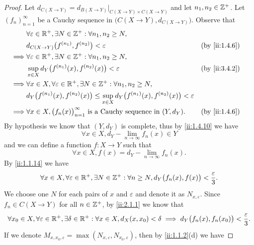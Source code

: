 \begin{proof}
  Let \(d_{C(X \to Y)} = d_{B(X \to Y)}|_{C(X \to Y) \times C(X \to Y)}\) and let \(n_1, n_2 \in \mathbb{Z}^+\).
  Let \((f_n)_{n = 1}^\infty\) be a Cauchy sequence in \(\big(C(X \to Y), d_{C(X \to Y)}\big)\).
  Observe that
  \begin{align*}
             & \forall \varepsilon \in \R^+, \exists N \in \Z^+ : \forall n_1, n_2 \geq N,                                                          \\
             & d_{C(X \to Y)}\big(f^{(n_1)}, f^{(n_2)}\big) < \varepsilon                                                        &  & \by{ii:1.4.6} \\
    \implies & \forall \varepsilon \in \R^+, \exists N \in \Z^+ : \forall n_1, n_2 \geq N,                                                          \\
             & \sup_{x \in X} d_Y\big(f^{(n_1)}(x), f^{(n_2)}(x)\big) < \varepsilon                                              &  & \by{ii:3.4.2} \\
    \implies & \forall x \in X, \forall \varepsilon \in \R^+, \exists N \in \Z^+ : \forall n_1, n_2 \geq N,                                         \\
             & d_Y\big(f^{(n_1)}(x), f^{(n_2)}(x)\big) \leq \sup_{x \in X} d_Y\big(f^{(n_1)}(x), f^{(n_2)}(x)\big) < \varepsilon                    \\
    \implies & \forall x \in X, \big(f_n(x)\big)_{n = 1}^\infty \text{ is a Cauchy sequence in } (Y, d_Y).                       &  & \by{ii:1.4.6}
  \end{align*}
  By hypothesis we know that \((Y, d_Y)\) is complete, thus by \cref{ii:1.4.10} we have
  \[
    \forall x \in X, d_Y - \lim_{n \to \infty} f_n(x) \in Y
  \]
  and we can define a function \(f : X \to Y\) such that
  \[
    \forall x \in X, f(x) = d_Y - \lim_{n \to \infty} f_n(x).
  \]
  By \cref{ii:1.1.14} we have
  \[
    \forall x \in X, \forall \varepsilon \in \mathbb{R}^+, \exists N \in \mathbb{Z}^+ : \forall n \geq N, d_Y\big(f_n(x), f(x)\big) < \dfrac{\varepsilon}{3}.
  \]
  We choose one \(N\) for each pairs of \(x\) and \(\varepsilon\) and denote it as \(N_{x, \varepsilon}\).
  Since \(f_n \in C(X \to Y)\) for all \(n \in \mathbb{Z}^+\), by \cref{ii:2.1.1} we know that
  \[
    \forall x_0 \in X, \forall \varepsilon \in \mathbb{R}^+, \exists \delta \in \mathbb{R}^+ : \forall x \in X, d_X(x, x_0) < \delta \implies d_Y\big(f_n(x), f_n(x_0)\big) < \dfrac{\varepsilon}{3}.
  \]
  If we denote \(M_{x, x_0, \varepsilon} = \max(N_{x, \varepsilon}, N_{x_0, \varepsilon})\), then by \cref{ii:1.1.2}(d) we have

\end{proof}
